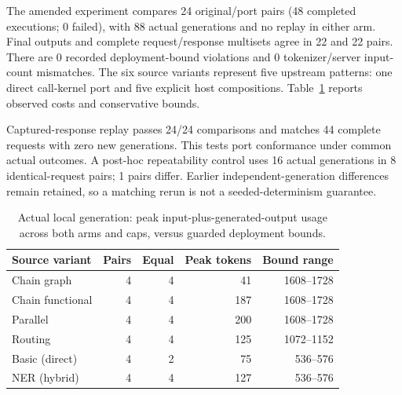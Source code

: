 The amended experiment compares 24 original/port pairs (48 completed executions; 0 failed), with 88 actual generations and no replay in either arm. Final outputs and complete request/response multisets agree in 22 and 22 pairs. There are 0 recorded deployment-bound violations and 0 tokenizer/server input-count mismatches. The six source variants represent five upstream patterns: one direct call-kernel port and five explicit host compositions. Table~\ref{tab:local} reports observed costs and conservative bounds.

Captured-response replay passes 24/24 comparisons and matches 44 complete requests with zero new generations. This tests port conformance under common actual outcomes. A post-hoc repeatability control uses 16 actual generations in 8 identical-request pairs; 1 pairs differ. Earlier independent-generation differences remain retained, so a matching rerun is not a seeded-determinism guarantee.

\begin{table}[!ht]
\centering\small
\begin{tabular}{lrrrr}
\hline
Source variant & Pairs & Equal & Peak tokens & Bound range \\
\hline
Chain graph & 4 & 4 & 41 & 1608--1728 \\
Chain functional & 4 & 4 & 187 & 1608--1728 \\
Parallel & 4 & 4 & 200 & 1608--1728 \\
Routing & 4 & 4 & 125 & 1072--1152 \\
Basic (direct) & 4 & 2 & 75 & 536--576 \\
NER (hybrid) & 4 & 4 & 127 & 536--576 \\
\hline
\end{tabular}
\caption{Actual local generation: peak input-plus-generated-output usage across both arms and caps, versus guarded deployment bounds.}
\label{tab:local}
\end{table}

